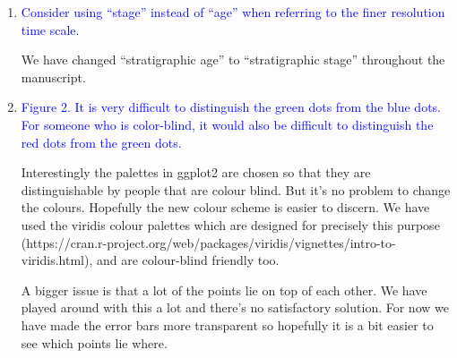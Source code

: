 \documentclass[12pt,letterpaper]{article}
\renewcommand{\section}[1]{%
\bigskip
\begin{center}
\begin{Large}
\normalfont\scshape #1
\medskip
\end{Large}
\end{center}}
\begin{document}
\begin{enumerate}
\item{\textcolor{blue}{Consider using ``stage'' instead of ``age'' when referring to the finer resolution time scale.}}

We have changed ``stratigraphic age'' to ``stratigraphic stage'' throughout the manuscript.

\item{\textcolor{blue}{Figure 2. It is very difficult to distinguish the green dots from the blue dots. For someone who is color-blind, it would also be difficult to distinguish the red dots from the green dots.}}


Interestingly the palettes in ggplot2 are chosen so that they are distinguishable by people that are colour blind. But it's no problem to change the colours. Hopefully the new colour scheme is easier to discern. We have used the viridis colour palettes which are designed for precisely this purpose (https://cran.r-project.org/web/packages/viridis/vignettes/intro-to-viridis.html), and are colour-blind friendly too. 

A bigger issue is that a lot of the points lie on top of each other. We have played around with this a lot and there's no satisfactory solution. For now we have made the error bars more transparent so hopefully it is a bit easier to see which points lie where.


\end{enumerate}


%
%




\end{document}
